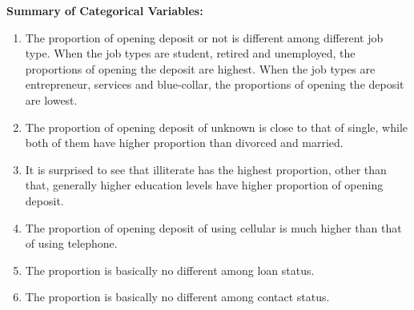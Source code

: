 \documentclass[11pt,a4paper]{article}
\begin{document}
    \noindent \textbf{Summary of Categorical Variables:}
    \begin{enumerate}
        \item 
            The proportion of opening deposit or not is different among different job type. When the job types are student, retired and unemployed, the proportions of opening the deposit are highest. When the job types are entrepreneur, services and blue-collar, the proportions of opening the deposit are lowest.
        
        \item
            The proportion of opening deposit of unknown is close to that of single, while both of them have higher proportion than divorced and married.
        
        \item
            It is surprised to see that illiterate has the highest proportion, other than that, generally higher education levels have higher proportion of opening deposit.
            
        \item
            The proportion of opening deposit of using cellular is much higher than that of using telephone.
            
        \item
            The proportion is basically no different among loan status.
            
        \item
            The proportion is basically no different among contact status.
    \end{enumerate}
    
\end{document}
